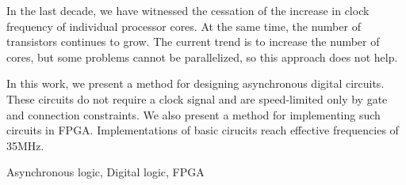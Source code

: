 
\abstract
In the last decade, we have witnessed the cessation of the increase in clock frequency of individual processor cores. At the same time, the number of transistors continues to grow. The current trend is to increase the number of cores, but some problems cannot be parallelized, so this approach does not help.

In this work, we present a method for designing asynchronous digital circuits. These circuits do not require a clock signal and are speed-limited only by gate and connection constraints. We also present a method for implementing such circuits in FPGA. Implementations of basic cirucits reach effective frequencies of 35MHz.

\keywords
Asynchronous logic, Digital logic, FPGA

